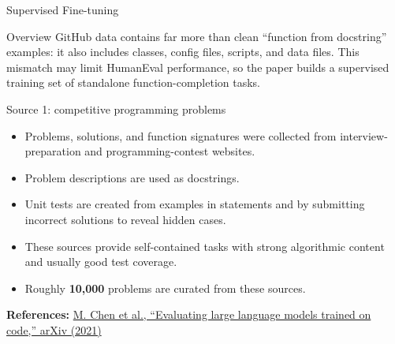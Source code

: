 \documentclass[aspectratio=43,9pt]{beamer}
\newcommand{\srclink}[2]{\href{#2}{\textcolor{black!68}{#1}}}
\newcommand{\refline}[2][References]{%
  \vfill
  {\raggedright\fontsize{5.1}{5.5}\selectfont\color{black!68}\textbf{#1:} #2\par}%
}
\newcommand{\srcChen}{\srclink{M. Chen et al., ``Evaluating large language models trained on code,'' arXiv (2021)}{https://arxiv.org/abs/2107.03374}}
\begin{document}
\begin{frame}{Supervised Fine-tuning}
\scriptsize
\begin{block}{Overview}
GitHub data contains far more than clean ``function from docstring'' examples: it also includes classes, config files, scripts, and data files. This mismatch may limit HumanEval performance, so the paper builds a supervised training set of standalone function-completion tasks.
\end{block}

\begin{block}{Source 1: competitive programming problems}
\begin{itemize}
  \item Problems, solutions, and function signatures were collected from interview-preparation and programming-contest websites.
  \item Problem descriptions are used as docstrings.
  \item Unit tests are created from examples in statements and by submitting incorrect solutions to reveal hidden cases.
  \item These sources provide self-contained tasks with strong algorithmic content and usually good test coverage.
  \item Roughly \textbf{10,000} problems are curated from these sources.
\end{itemize}
\end{block}

\refline{\srcChen}
\end{frame}
\end{document}
